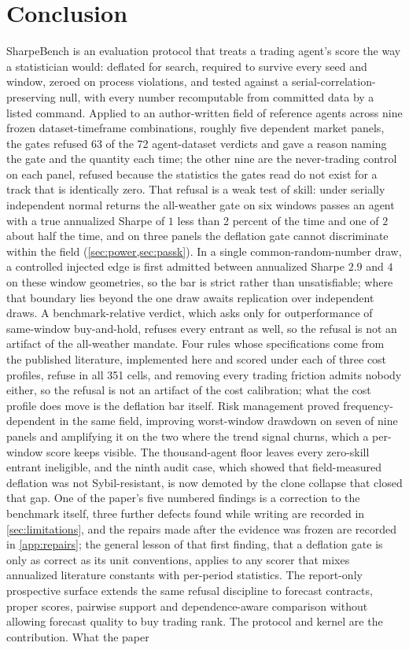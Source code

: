 \section{Conclusion}\label{sec:conclusion}

SharpeBench is an evaluation protocol that treats a trading agent's score the way a statistician would: deflated for search, required to survive every seed and window, zeroed on process violations, and tested against a serial-correlation-preserving null, with every number recomputable from committed data by a listed command. Applied to an author-written field of reference agents across nine frozen dataset-timeframe combinations, roughly five dependent market panels, the gates refused 63 of the 72 agent-dataset verdicts and gave a reason naming the gate and the quantity each time; the other nine are the never-trading control on each panel, refused because the statistics the gates read do not exist for a track that is identically zero. That refusal is a weak test of skill: under serially independent normal returns the all-weather gate on six windows passes an agent with a true annualized Sharpe of $1$ less than 2 percent of the time and one of $2$ about half the time, and on three panels the deflation gate cannot discriminate within the field (\cref{sec:power,sec:passk}). In a single common-random-number draw, a controlled injected edge is first admitted between annualized Sharpe $2.9$ and $4$ on these window geometries, so the bar is strict rather than unsatisfiable; where that boundary lies beyond the one draw awaits replication over independent draws. A benchmark-relative verdict, which asks only for outperformance of same-window buy-and-hold, refuses every entrant as well, so the refusal is not an artifact of the all-weather mandate. Four rules whose specifications come from the published literature, implemented here and scored under each of three cost profiles, refuse in all 351 cells, and removing every trading friction admits nobody either, so the refusal is not an artifact of the cost calibration; what the cost profile does move is the deflation bar itself. Risk management proved frequency-dependent in the same field, improving worst-window drawdown on seven of nine panels and amplifying it on the two where the trend signal churns, which a per-window score keeps visible. The thousand-agent floor leaves every zero-skill entrant ineligible, and the ninth audit case, which showed that field-measured deflation was not Sybil-resistant, is now demoted by the clone collapse that closed that gap. One of the paper's five numbered findings is a correction to the benchmark itself, three further defects found while writing are recorded in \cref{sec:limitations}, and the repairs made after the evidence was frozen are recorded in \cref{app:repairs}; the general lesson of that first finding, that a deflation gate is only as correct as its unit conventions, applies to any scorer that mixes annualized literature constants with per-period statistics. The report-only prospective surface extends the same refusal discipline to forecast contracts, proper scores, pairwise support and dependence-aware comparison without allowing forecast quality to buy trading rank. The protocol and kernel are the contribution. What the paper 